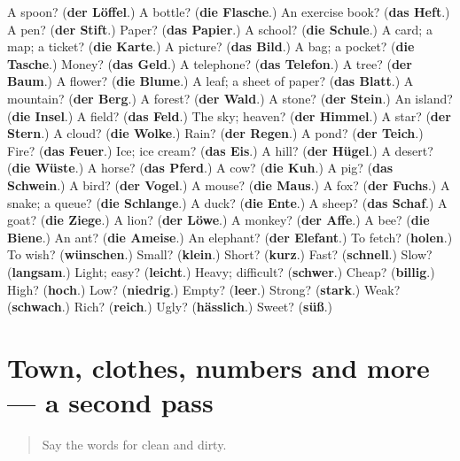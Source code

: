 \begin{tcolorbox}[breakable,colback=teal!4,colframe=teal!35!black,title={Before you move on}]
A spoon? (\textbf{der Löffel}.) A bottle? (\textbf{die Flasche}.) An exercise book? (\textbf{das Heft}.) A pen? (\textbf{der Stift}.) Paper? (\textbf{das Papier}.) A school? (\textbf{die Schule}.) A card; a map; a ticket? (\textbf{die Karte}.) A picture? (\textbf{das Bild}.) A bag; a pocket? (\textbf{die Tasche}.) Money? (\textbf{das Geld}.) A telephone? (\textbf{das Telefon}.) A tree? (\textbf{der Baum}.) A flower? (\textbf{die Blume}.) A leaf; a sheet of paper? (\textbf{das Blatt}.) A mountain? (\textbf{der Berg}.) A forest? (\textbf{der Wald}.) A stone? (\textbf{der Stein}.) An island? (\textbf{die Insel}.) A field? (\textbf{das Feld}.) The sky; heaven? (\textbf{der Himmel}.) A star? (\textbf{der Stern}.) A cloud? (\textbf{die Wolke}.) Rain? (\textbf{der Regen}.) A pond? (\textbf{der Teich}.) Fire? (\textbf{das Feuer}.) Ice; ice cream? (\textbf{das Eis}.) A hill? (\textbf{der Hügel}.) A desert? (\textbf{die Wüste}.) A horse? (\textbf{das Pferd}.) A cow? (\textbf{die Kuh}.) A pig? (\textbf{das Schwein}.) A bird? (\textbf{der Vogel}.) A mouse? (\textbf{die Maus}.) A fox? (\textbf{der Fuchs}.) A snake; a queue? (\textbf{die Schlange}.) A duck? (\textbf{die Ente}.) A sheep? (\textbf{das Schaf}.) A goat? (\textbf{die Ziege}.) A lion? (\textbf{der Löwe}.) A monkey? (\textbf{der Affe}.) A bee? (\textbf{die Biene}.) An ant? (\textbf{die Ameise}.) An elephant? (\textbf{der Elefant}.) To fetch? (\textbf{holen}.) To wish? (\textbf{wünschen}.) Small? (\textbf{klein}.) Short? (\textbf{kurz}.) Fast? (\textbf{schnell}.) Slow? (\textbf{langsam}.) Light; easy? (\textbf{leicht}.) Heavy; difficult? (\textbf{schwer}.) Cheap? (\textbf{billig}.) High? (\textbf{hoch}.) Low? (\textbf{niedrig}.) Empty? (\textbf{leer}.) Strong? (\textbf{stark}.) Weak? (\textbf{schwach}.) Rich? (\textbf{reich}.) Ugly? (\textbf{hässlich}.) Sweet? (\textbf{süß}.)
\end{tcolorbox}
\section[(dialogue)]{Town, clothes, numbers and more — a second pass}

\label{lesson:GE-R103-second-pass-town-clothes-numbers-and-more}



\begin{quote}
Say the words for clean and dirty.
\end{quote}

